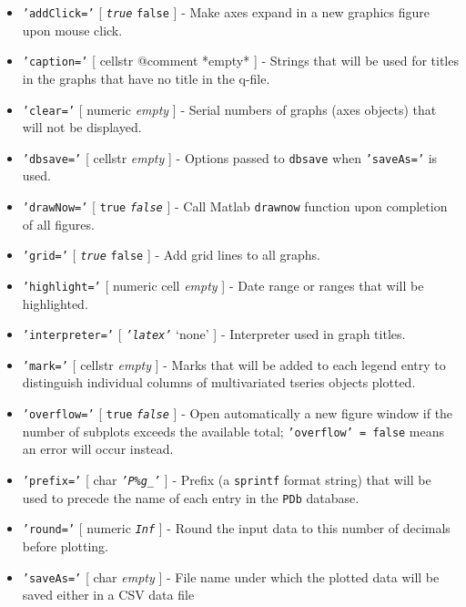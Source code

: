 \begin{itemize}
\item
  \texttt{'addClick='} {[} \emph{\texttt{true}} \textbar{}
  \texttt{false} {]} - Make axes expand in a new graphics figure upon
  mouse click.
\item
  \texttt{'caption='} {[} cellstr \textbar{} @comment \textbar{} *empty*
  {]} - Strings that will be used for titles in the graphs that have no
  title in the q-file.
\item
  \texttt{'clear='} {[} numeric \textbar{} \emph{empty} {]} - Serial
  numbers of graphs (axes objects) that will not be displayed.
\item
  \texttt{'dbsave='} {[} cellstr \textbar{} \emph{empty} {]} - Options
  passed to \texttt{dbsave} when \texttt{'saveAs='} is used.
\item
  \texttt{'drawNow='} {[} \texttt{true} \textbar{} \emph{\texttt{false}}
  {]} - Call Matlab \texttt{drawnow} function upon completion of all
  figures.
\item
  \texttt{'grid='} {[} \emph{\texttt{true}} \textbar{} \texttt{false}
  {]} - Add grid lines to all graphs.
\item
  \texttt{'highlight='} {[} numeric \textbar{} cell \textbar{}
  \emph{empty} {]} - Date range or ranges that will be highlighted.
\item
  \texttt{'interpreter='} {[} \emph{\texttt{'latex'}} \textbar{} `none'
  {]} - Interpreter used in graph titles.
\item
  \texttt{'mark='} {[} cellstr \textbar{} \emph{empty} {]} - Marks that
  will be added to each legend entry to distinguish individual columns
  of multivariated tseries objects plotted.
\item
  \texttt{'overflow='} {[} \texttt{true} \textbar{}
  \emph{\texttt{false}} {]} - Open automatically a new figure window if
  the number of subplots exceeds the available total;
  \texttt{'overflow' = false} means an error will occur instead.
\item
  \texttt{'prefix='} {[} char \textbar{} \emph{\texttt{'P\%g\_'}} {]} -
  Prefix (a \texttt{sprintf} format string) that will be used to precede
  the name of each entry in the \texttt{PDb} database.
\item
  \texttt{'round='} {[} numeric \textbar{} \emph{\texttt{Inf}} {]} -
  Round the input data to this number of decimals before plotting.
\item
  \texttt{'saveAs='} {[} char \textbar{} \emph{empty} {]} - File name
  under which the plotted data will be saved either in a CSV data file

\end{itemize}
